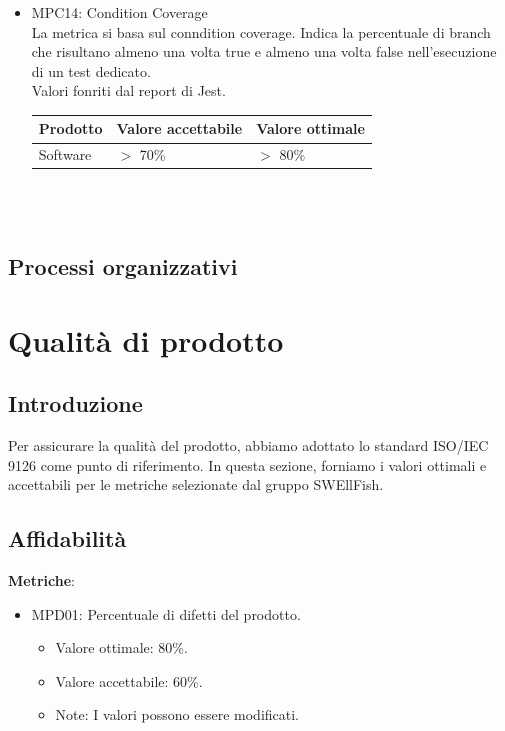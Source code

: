 \documentclass[12pt]{article}
\begin{document}
\begin{itemize}
\item MPC14: Condition Coverage \\
La metrica si basa sul conndition coverage. Indica la percentuale di branch che risultano almeno una volta true e almeno una volta false nell'esecuzione di un test dedicato. \\
Valori fonriti dal report di Jest.

\begin{center}
	\begin{tabularx}{\textwidth}{|X|X|X|}
		\hline
		\textbf{Prodotto} & \textbf{Valore accettabile } & \textbf{Valore ottimale } \\
		\hline
		Software          & $>$ 70\%                     & $>$ 80\%                     \\
		\hline
	\end{tabularx}\\[8pt]
	\mbox{}\\
\end{center}

\end{itemize}


\subsection{Processi organizzativi}

\section{Qualità di prodotto}
\subsection{Introduzione}
Per assicurare la qualità del prodotto, abbiamo adottato lo standard ISO/IEC 9126 come punto di riferimento. In questa sezione, forniamo i valori ottimali e accettabili per le metriche selezionate dal gruppo SWEllFish.



\subsection{Affidabilità}
\textbf{Metriche}:
\begin{itemize}
	\item MPD01: Percentuale di difetti del prodotto.
	      \begin{itemize}
		      \item Valore ottimale: 80\%.
		      \item Valore accettabile: 60\%.
		      \item Note: I valori possono essere modificati.
	      \end{itemize}
\end{itemize}
\end{document}
